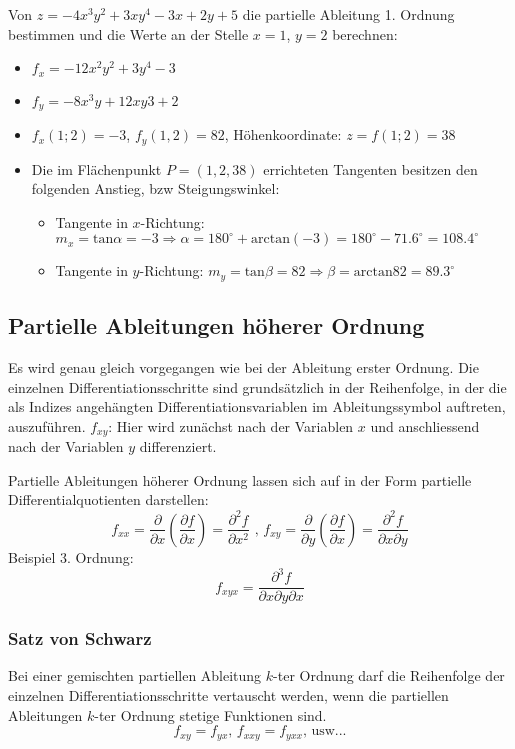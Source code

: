 \begin{bsp}
Von  $ z = -4x^3y^2 + 3xy^4 - 3x +2y +5$ die partielle Ableitung 1. Ordnung bestimmen und die Werte an der Stelle $x=1$, $y=2$ berechnen:
\begin{itemize}
		\item $f_x= -12x^2y^2+3y^4-3$
		\item $f_y = -8x^3y + 12xy3 +2$
		\item $f_x(1;2) = -3$, $f_y(1,2) = 82$, Höhenkoordinate: $z = f(1;2) = 38$
		\item Die im Flächenpunkt $P = (1, 2, 38)$ errichteten Tangenten besitzen den folgenden Anstieg, bzw Steigungswinkel:
		\begin{itemize}
			\item Tangente in $x$-Richtung: $m_x = \text{tan} \alpha = -3 \Rightarrow \alpha = 180^\circ + \text{arctan}(-3) = 180^\circ - 71.6^\circ = 108.4^\circ$
			\item Tangente in $y$-Richtung: $m_y =  \text{tan} \beta = 82 \Rightarrow \beta = \text{arctan} 82 = 89.3^\circ$
		\end{itemize}
\end{itemize}
\end{bsp}

\subsection{Partielle Ableitungen höherer Ordnung}
\begin{definition}
Es wird genau gleich vorgegangen wie bei der Ableitung erster Ordnung. Die einzelnen Differentiationsschritte sind grundsätzlich in der Reihenfolge, in der die als Indizes angehängten Differentiationsvariablen im Ableitungssymbol auftreten, auszuführen. $f_{xy}$: Hier wird zunächst nach der Variablen $x$ und anschliessend nach der Variablen $y$ differenziert.

Partielle Ableitungen höherer Ordnung lassen sich auf in der Form partielle Differentialquotienten darstellen:
$$
f_{xx} = \frac{\partial}{\partial x} \left( \frac{\partial f}{\partial x} \right) = \frac{\partial^2 f}{\partial x^2} 
\text{ , } 
f_{xy} = \frac{\partial}{\partial y} \left( \frac{\partial f}{\partial x} \right) = \frac{\partial^2 f}{\partial x \partial y} 
$$
Beispiel 3. Ordnung:
$$ f_{xyx} = \frac{\partial^3 f}{\partial x \partial y \partial x} $$
\end{definition}

\subsubsection{Satz von Schwarz}
\begin{definition}
Bei einer gemischten partiellen Ableitung $k$-ter Ordnung darf die Reihenfolge der einzelnen Differentiationsschritte vertauscht werden, wenn die partiellen Ableitungen $k$-ter Ordnung stetige Funktionen sind.
$$ f_{xy} = f_{yx} \text{, }  f_{xxy} = f_{yxx} \text{, usw...}$$
\end{definition}